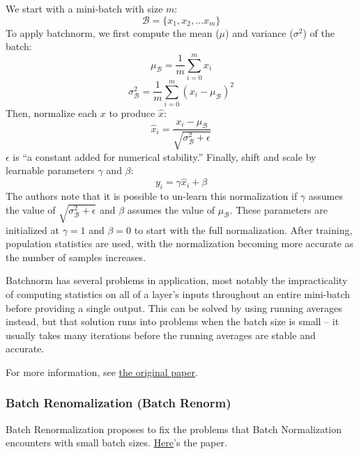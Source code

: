 \documentclass[fleqn]{article}
\begin{document}
We start with a mini-batch with size $m$:
\[ \mathcal{B} = \{x_1, x_2, \dots x_m\} \]
To apply batchnorm, we first compute the mean ($\mu$) and variance
($\sigma^2$) of the batch:
\[ \mu_\mathcal{B} = \frac{1}{m} \sum_{i=0}^m x_i \]
\[ \sigma_\mathcal{B}^2 = \frac{1}{m} \sum_{i=0}^m
	(x_i - \mu_\mathcal{B})^2 \]
Then, normalize each $x$ to produce $\hat x$:
\[ \hat x_i = \frac{x_i - \mu_\mathcal{B}}
	{\sqrt{\sigma_\mathcal{B}^2 + \epsilon}} \]
$\epsilon$ is ``a constant added for numerical stability.'' Finally, shift
and scale by learnable parameters $\gamma$ and $\beta$:
\[ y_i = \gamma \hat x_i + \beta \]
The authors note that it is possible to un-learn this normalization if
$\gamma$ assumes the value of $\sqrt{\sigma_\mathcal{B}^2 + \epsilon}$ and
$\beta$ assumes the value of $\mu_\mathcal{B}$. These parameters are
initialized at $\gamma=1$ and $\beta=0$ to start with the full
normalization. After training, population statistics are used, with the
normalization becoming more accurate as the number of samples increases.

Batchnorm has several problems in application, most notably the
impracticality of computing statistics on all of a layer's inputs
throughout an entire mini-batch before providing a single output. This can
be solved by using running averages instead, but that solution runs into
problems when the batch size is small -- it usually takes many iterations
before the running averages are stable and accurate.

For more information, see \href{https://arxiv.org/pdf/1502.03167.pdf}{the
original paper}.

\subsubsection{Batch Renomalization (Batch Renorm)}
Batch Renormalization proposes to fix the problems that Batch
Normalization encounters with small batch sizes.
\href{https://arxiv.org/pdf/1702.03275.pdf}{Here}'s the paper.
\end{document}
